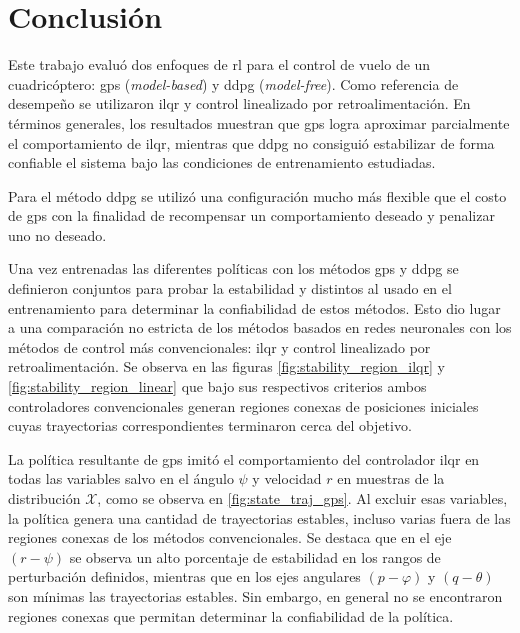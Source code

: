 \chapter{Conclusión}
\label{chapter:conclusion}

Este trabajo evaluó dos enfoques de \acrshort{rl} para el control de vuelo de un cuadricóptero: \acrshort{gps} (\textit{model-based}) y \acrshort{ddpg} (\textit{model-free}). Como referencia de desempeño se utilizaron \acrshort{ilqr} y control linealizado por retroalimentación. En términos generales, los resultados muestran que \acrshort{gps} logra aproximar parcialmente el comportamiento de \acrshort{ilqr}, mientras que \acrshort{ddpg} no consiguió estabilizar de forma confiable el sistema bajo las condiciones de entrenamiento estudiadas.

Para el método \acrshort{ddpg} se utilizó una configuración mucho más flexible que el costo de \acrshort{gps} con la finalidad de recompensar un comportamiento deseado y penalizar uno no deseado. 

Una vez entrenadas las diferentes políticas con los métodos \acrshort{gps} y \acrshort{ddpg} se definieron conjuntos para probar la estabilidad y distintos al usado en el entrenamiento para determinar la confiabilidad de estos métodos. Esto dio lugar a una comparación no estricta de los métodos basados en redes neuronales con los métodos de control más convencionales: \acrshort{ilqr} y control linealizado por retroalimentación. Se observa en las figuras \ref{fig:stability_region_ilqr} y \ref{fig:stability_region_linear} que bajo sus respectivos criterios ambos controladores convencionales generan regiones conexas de posiciones iniciales cuyas trayectorias correspondientes terminaron cerca del objetivo. 

La política resultante de \acrshort{gps} imitó el comportamiento del controlador \acrshort{ilqr} en todas las variables salvo en el ángulo $\psi$ y velocidad $r$ en muestras de la distribución $\mathcal{X}$, como se observa en \ref{fig:state_traj_gps}. Al excluir esas variables, la política genera una cantidad de trayectorias estables, incluso varias fuera de las regiones conexas de los métodos convencionales. Se destaca que en el eje $(r-\psi)$ se observa un alto porcentaje de estabilidad en los rangos de perturbación definidos, mientras que en los ejes angulares $(p-\varphi)$ y $(q-\theta)$ son mínimas las trayectorias estables. Sin embargo, en general no se encontraron regiones conexas que permitan determinar la confiabilidad de la política. 

